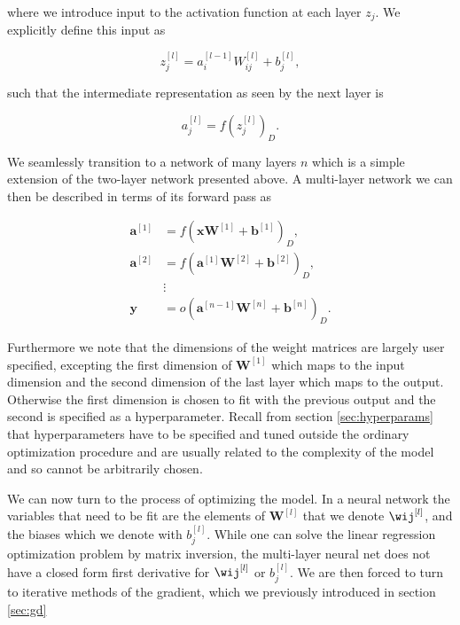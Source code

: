 \noindent where we introduce input to the activation function at each layer $z_j$. We explicitly define this input as 

\begin{equation}\label{eq:fwd_multi}
	z_{j}^{[l]} = a^{[l-1]}_iW^{[l]}_{ij} + b^{[l]}_j,
\end{equation}

\noindent such that the intermediate representation as seen by the next layer is

\begin{equation}\label{eq:z}
a_j ^{[l]} = f(z_j^{[l]})_D.
\end{equation}


\noindent We seamlessly transition to a network of many layers $n$ which is a simple extension of the two-layer network presented above. A multi-layer network we can then be described in terms of its forward pass as 

\begin{align}
\mathbf{a}^{[1]} &= f(\mathbf{x}\mathbf{W}^{[1]}+ \mathbf{b}^{[1]})_D , \\
\mathbf{a}^{[2]} &= f(\mathbf{a}^{[1]}\mathbf{W}^{[2]}+ \mathbf{b}^{[2]})_D , \\
&\vdots \\
\mathbf{y} &= o(\mathbf{a}^{[n-1]}\mathbf{W}^{[n]} + \mathbf{b}^{[n]})_D .
\end{align} 

\noindent Furthermore we note that the dimensions of the weight matrices are largely user specified, excepting the first dimension of $\mathbf{W}^{[1]}$ which maps to the input dimension and the second dimension of the last layer which maps to the output. Otherwise the first dimension is chosen to fit with the previous output and the second is specified as a hyperparameter. Recall from section \ref{sec:hyperparams} that hyperparameters have to be specified and tuned outside the ordinary optimization procedure and are usually related to the complexity of the model and so cannot be arbitrarily chosen. 

We can now turn to the process of optimizing the model. In a neural network the variables that need to be fit are the elements of $\mathbf{W}^{[l]}$ that we denote $\wij^{[l]}$, and the biases which we denote with $b_j^{[l]}$. While one can solve the linear regression optimization problem by matrix inversion, the multi-layer neural net does not have a closed form first derivative for $\wij^{[l]}$ or  $b_j^{[l]}$. We are then forced to turn to iterative methods of the gradient, which we previously introduced in section \ref{sec:gd}


